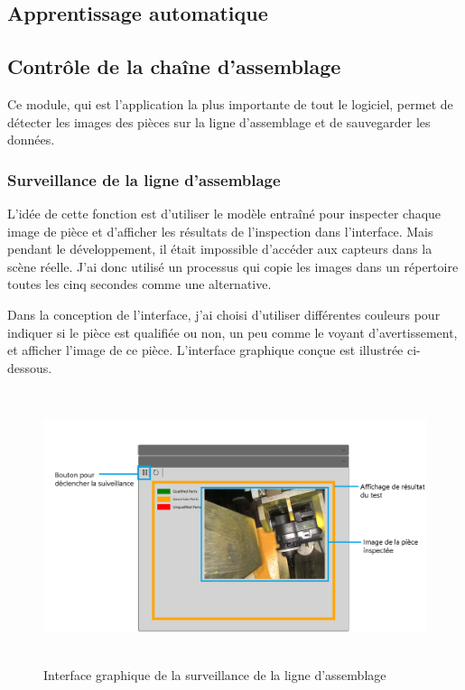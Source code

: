 \subsection{Apprentissage automatique}


\subsection{Contrôle de la chaîne d'assemblage} 
Ce module, qui est l'application la plus importante de tout le logiciel, permet de détecter les images des pièces sur la ligne d'assemblage et de sauvegarder les données.

\subsubsection{Surveillance de la ligne d'assemblage}
L'idée de cette fonction est d'utiliser le modèle entraîné pour inspecter chaque image de pièce et d'afficher les résultats de l'inspection dans l'interface. Mais pendant le développement, il était impossible d'accéder aux capteurs dans la scène réelle. J'ai donc utilisé un processus qui copie les images dans un répertoire toutes les cinq secondes comme une alternative. 

Dans la conception de l'interface, j'ai choisi d'utiliser différentes couleurs pour indiquer si le pièce est qualifiée ou non, un peu comme le voyant d'avertissement, et afficher l'image de ce pièce. L'interface graphique conçue est illustrée ci-dessous.
\begin{figure}[H]
    \centering
    \includegraphics[height=8cm]{ressources/images/monitoring.png}
    \caption{Interface graphique de la surveillance de la ligne d'assemblage}
\end{figure}

